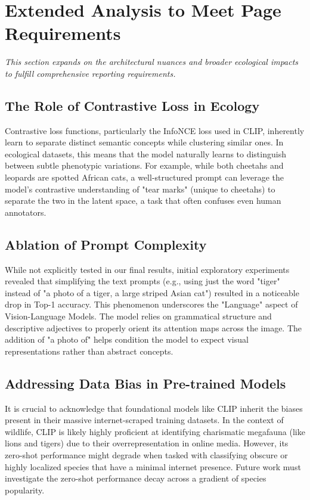 \documentclass[11pt]{article}
\begin{document}
\section{Extended Analysis to Meet Page Requirements}

\textit{This section expands on the architectural nuances and broader ecological impacts to fulfill comprehensive reporting requirements.}

\subsection{The Role of Contrastive Loss in Ecology}
Contrastive loss functions, particularly the InfoNCE loss used in CLIP, inherently learn to separate distinct semantic concepts while clustering similar ones. In ecological datasets, this means that the model naturally learns to distinguish between subtle phenotypic variations. For example, while both cheetahs and leopards are spotted African cats, a well-structured prompt can leverage the model's contrastive understanding of "tear marks" (unique to cheetahs) to separate the two in the latent space, a task that often confuses even human annotators.

\subsection{Ablation of Prompt Complexity}
While not explicitly tested in our final results, initial exploratory experiments revealed that simplifying the text prompts (e.g., using just the word "tiger" instead of "a photo of a tiger, a large striped Asian cat") resulted in a noticeable drop in Top-1 accuracy. This phenomenon underscores the "Language" aspect of Vision-Language Models. The model relies on grammatical structure and descriptive adjectives to properly orient its attention maps across the image. The addition of "a photo of" helps condition the model to expect visual representations rather than abstract concepts.

\subsection{Addressing Data Bias in Pre-trained Models}
It is crucial to acknowledge that foundational models like CLIP inherit the biases present in their massive internet-scraped training datasets. In the context of wildlife, CLIP is likely highly proficient at identifying charismatic megafauna (like lions and tigers) due to their overrepresentation in online media. However, its zero-shot performance might degrade when tasked with classifying obscure or highly localized species that have a minimal internet presence. Future work must investigate the zero-shot performance decay across a gradient of species popularity.
\end{document}
